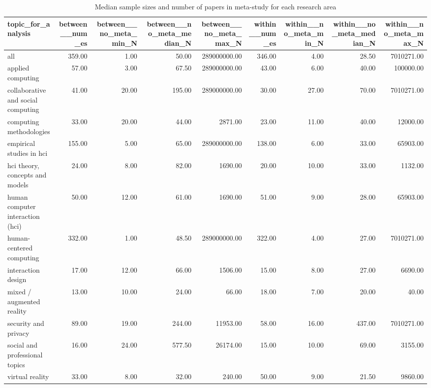 \begin{table}[ht]
\centering
\begin{tabular}{lrrrrrrrr}
  \hline
topic\_for\_analysis & between\_\_num\_es & between\_\_no\_meta\_min\_N & between\_\_no\_meta\_median\_N & between\_\_no\_meta\_max\_N & within\_\_num\_es & within\_\_no\_meta\_min\_N & within\_\_no\_meta\_median\_N & within\_\_no\_meta\_max\_N \\ 
  \hline
all & 359.00 & 1.00 & 50.00 & 289000000.00 & 346.00 & 4.00 & 28.50 & 7010271.00 \\ 
  applied computing & 57.00 & 3.00 & 67.50 & 289000000.00 & 43.00 & 6.00 & 40.00 & 100000.00 \\ 
  collaborative and social computing & 41.00 & 20.00 & 195.00 & 289000000.00 & 30.00 & 27.00 & 70.00 & 7010271.00 \\ 
  computing methodologies & 33.00 & 20.00 & 44.00 & 2871.00 & 23.00 & 11.00 & 40.00 & 12000.00 \\ 
  empirical studies in hci & 155.00 & 5.00 & 65.00 & 289000000.00 & 138.00 & 6.00 & 33.00 & 65903.00 \\ 
  hci theory, concepts and models & 24.00 & 8.00 & 82.00 & 1690.00 & 20.00 & 10.00 & 33.00 & 1132.00 \\ 
  human computer interaction (hci) & 50.00 & 12.00 & 61.00 & 1690.00 & 51.00 & 9.00 & 28.00 & 65903.00 \\ 
  human-centered computing & 332.00 & 1.00 & 48.50 & 289000000.00 & 322.00 & 4.00 & 27.00 & 7010271.00 \\ 
  interaction design & 17.00 & 12.00 & 66.00 & 1506.00 & 15.00 & 8.00 & 27.00 & 6690.00 \\ 
  mixed / augmented reality & 13.00 & 10.00 & 24.00 & 66.00 & 18.00 & 7.00 & 20.00 & 40.00 \\ 
  security and privacy & 89.00 & 19.00 & 244.00 & 11953.00 & 58.00 & 16.00 & 437.00 & 7010271.00 \\ 
  social and professional topics & 16.00 & 24.00 & 577.50 & 26174.00 & 15.00 & 10.00 & 69.00 & 3155.00 \\ 
  virtual reality & 33.00 & 8.00 & 32.00 & 240.00 & 50.00 & 9.00 & 21.50 & 9860.00 \\ 
   \hline
\end{tabular}
\caption{Median sample sizes and number of papers in meta-study for each research area} 
\label{tab:reliability judgment table}
\end{table}

